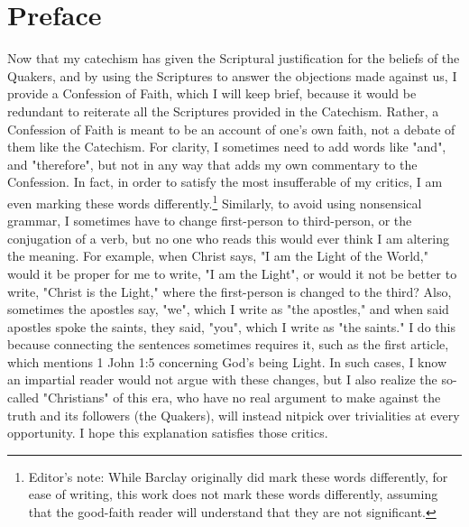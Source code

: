 \documentclass[../main.tex]{subfiles}
\begin{document}
	
	\chapter*{Preface}
	
	Now that my catechism has given the Scriptural justification for the beliefs of the Quakers, and by using the Scriptures to answer the objections made against us, I provide a Confession of Faith, which I will keep brief, because it would be redundant to reiterate all the Scriptures provided in the Catechism. Rather, a Confession of Faith is meant to be an account of one's own faith, not a debate of them like the Catechism. For clarity, I sometimes need to add words like "and", and "therefore", but not in any way that adds my own commentary to the Confession. In fact, in order to satisfy the most insufferable of my critics, I am even marking these words differently.\footnote{Editor's note: While Barclay originally did mark these words differently, for ease of writing, this work does not mark these words differently, assuming that the good-faith reader will understand that they are not significant.} Similarly, to avoid using nonsensical grammar, I sometimes have to  change first-person to third-person, or the conjugation of a verb, but no one who reads this would ever think I am altering the meaning. For example, when Christ says, "I am the Light of the World," would it be proper for me to write, "I am the Light", or would it not be better to write, "Christ is the Light," where the first-person is changed to the third? Also, sometimes the apostles say, "we", which I write as "the apostles," and when said apostles spoke the saints, they said, "you", which I write as "the saints." I do this because connecting the sentences sometimes requires it, such as the first article, which mentions 1 John 1:5 concerning God's being Light. In such cases, I know an impartial reader would not argue with these changes, but I also realize the so-called "Christians" of this era, who have no real argument to make against the truth and its followers (the Quakers), will instead nitpick over trivialities at every opportunity. I hope this explanation satisfies those critics.

	\theendnotes
	\setcounter{endnote}{0}
\end{document}
